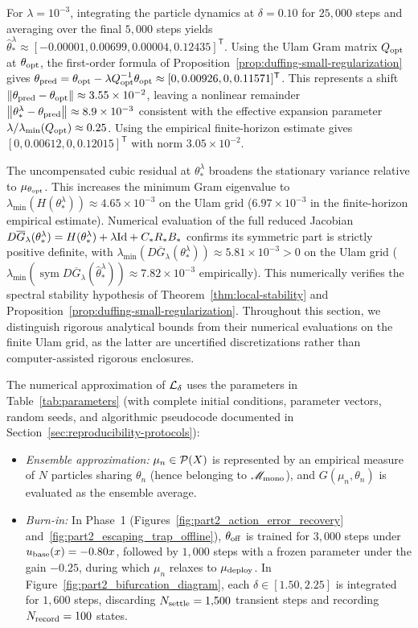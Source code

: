 For $\lambda = 10^{-3}$, integrating the particle dynamics at $\delta=0.10$ for $25{,}000$ steps and averaging over the final $5{,}000$ steps yields $\hat{\theta}_*^\lambda \approx [-0.00001, 0.00699, 0.00004, 0.12435]^{\mathsf T}$. Using the Ulam Gram matrix $Q_{\rm opt}$ at $\theta_{\rm opt}$, the first-order formula of Proposition~\ref{prop:duffing-small-regularization} gives $\theta_{\rm pred} = \theta_{\rm opt} - \lambda Q_{\rm opt}^{-1}\theta_{\rm opt} \approx [0, 0.00926, 0, 0.11571]^{\mathsf T}$. This represents a shift $\left\lVert \theta_{\rm pred} - \theta_{\rm opt}\right\rVert \approx 3.55\times 10^{-2}$, leaving a nonlinear remainder $\left\lVert \theta_*^\lambda - \theta_{\rm pred}\right\rVert \approx 8.9\times 10^{-3}$ consistent with the effective expansion parameter $\lambda/\lambda_{\min}(Q_{\rm opt}) \approx 0.25$. Using the empirical finite-horizon estimate gives $[0, 0.00612, 0, 0.12015]^{\mathsf T}$ with norm $3.05\times 10^{-2}$.

The uncompensated cubic residual at $\theta_*^\lambda$ broadens the stationary variance relative to $\mu_{\theta_{\rm opt}}$. This increases the minimum Gram eigenvalue to $\lambda_{\min}(H(\theta_*^\lambda)) \approx 4.65\times 10^{-3}$ on the Ulam grid ($6.97\times 10^{-3}$ in the finite-horizon empirical estimate). Numerical evaluation of the full reduced Jacobian $D\overline G_\lambda(\theta_*^\lambda) = H(\theta_*^\lambda) + \lambda\mathrm{Id} + C_*R_*B_*$ confirms its symmetric part is strictly positive definite, with $\lambda_{\min}(D\overline G_\lambda(\theta_*^\lambda)) \approx 5.81\times 10^{-3} > 0$ on the Ulam grid ($\lambda_{\min}(\operatorname{sym} D\overline G_\lambda(\hat{\theta}_*^\lambda)) \approx 7.82\times 10^{-3}$ empirically). This numerically verifies the spectral stability hypothesis of Theorem~\ref{thm:local-stability} and Proposition~\ref{prop:duffing-small-regularization}. Throughout this section, we distinguish rigorous analytical bounds from their numerical evaluations on the finite Ulam grid, as the latter are uncertified discretizations rather than computer-assisted rigorous enclosures.

The numerical approximation of $\mathcal{L}_\delta$ uses the parameters in Table~\ref{tab:parameters} (with complete initial conditions, parameter vectors, random seeds, and algorithmic pseudocode documented in Section~\ref{sec:reproducibility-protocols}):
\begin{itemize}
    \item \emph{Ensemble approximation:} $\mu_n \in \mathcal{P}(X)$ is represented by an empirical measure of $N$ particles sharing $\theta_n$ (hence belonging to $\mathscr{M}_{\mathrm{mono}}$), and $G(\mu_n,\theta_n)$ is evaluated as the ensemble average.
    \item \emph{Burn-in:} In Phase~1 (Figures~\ref{fig:part2_action_error_recovery} and~\ref{fig:part2_escaping_trap_offline}), $\theta_{\rm off}$ is trained for $3{,}000$ steps under $u_{\rm base}(x) = -0.80x$, followed by $1{,}000$ steps with a frozen parameter under the gain $-0.25$, during which $\mu_n$ relaxes to $\mu_{\rm deploy}$. In Figure~\ref{fig:part2_bifurcation_diagram}, each $\delta \in [1.50, 2.25]$ is integrated for $1{,}600$ steps, discarding $N_{\rm settle}=1{,}500$ transient steps and recording $N_{\rm record}=100$ states.
\end{itemize}

